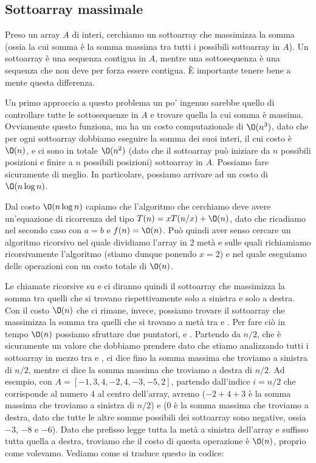 \documentclass[11pt, a4paper, titlepage, oneside]{scrbook}
\begin{document}
\subsection{Sottoarray massimale}

Preso un array $A$ di interi, cerchiamo un sottoarray che massimizza la somma (ossia la cui somma è la somma massima tra tutti i possibili sottoarray in $A$). \NB Un sottoarray è una sequenza contigua in $A$, mentre una sottosequenza è una sequenza che non deve per forza essere contigua. È importante tenere bene a mente questa differenza. 

Un primo approccio a questo problema un po' ingenuo sarebbe quello di controllare tutte le sottosequenze in $A$ e trovare quella la cui somma è massima. Ovviamente questo funziona, ma ha un costo computazionale di $\O(n^3)$, dato che per ogni sottoarray dobbiamo eseguire la somma dei suoi interi, il cui costo è $\O(n)$, e ci sono in totale $\O(n^2)$ (dato che il sottoarray può iniziare da $n$ possibili posizioni e finire a $n$ possibili posizioni) sottoarray in $A$. Possiamo fare sicuramente di meglio. In particolare, possiamo arrivare ad un costo di $\O(n \log n)$.

Dal costo $\O(n \log n)$ capiamo che l'algoritmo che cerchiamo deve avere un'equazione di ricorrenza del tipo $T(n) = x T(n/x) + \O(n)$, dato che ricadiamo nel secondo caso con $a = b$ e $f(n) = \O(n)$. Può quindi aver senso cercare un algoritmo ricorsivo nel quale dividiamo l'array in 2 metà  e  sulle quali richiamiamo ricorsivamente l'algoritmo (stiamo dunque ponendo $x = 2$) e nel quale eseguiamo delle operazioni con un costo totale di $\O(n)$. 

Le chiamate ricorsive su  e  ci diranno quindi il sottoarray che massimizza la somma tra quelli che si trovano rispettivamente solo a sinistra e solo a destra. Con il costo $\O(n)$ che ci rimane, invece, possiamo trovare il sottoarray che massimizza la somma tra quelli che si trovano a metà tra  e . Per fare ciò in tempo $\O(n)$ possiamo sfruttare due puntatori,  e . Partendo da $n/2$, che è sicuramente un valore che dobbiamo prendere dato che stiamo analizzando tutti i sottoarray in mezzo tra  e ,  ci dice fino la somma massima che troviamo a sinistra di $n/2$, mentre  ci dice la somma massima che troviamo a destra di $n/2$. Ad esempio, con $A = [-1,3,4,-2,4,-3,-5,2]$, partendo dall'indice $i = n/2$ che corrisponde al numero $4$ al centro dell'array, avremo  ($-2+4+3$ è la somma massima che troviamo a sinistra di $n/2$) e  ($0$ è la somma massima che troviamo a destra, dato che tutte le altre somme possibili dei sottoarray sono negative, ossia $-3$, $-8$ e $-6$). Dato che prefisso legge tutta la metà a sinistra dell'array e suffisso tutta quella a destra, troviamo che il costo di questa operazione è $\O(n)$, proprio come volevamo. Vediamo come si traduce questo in codice:
\end{document}
